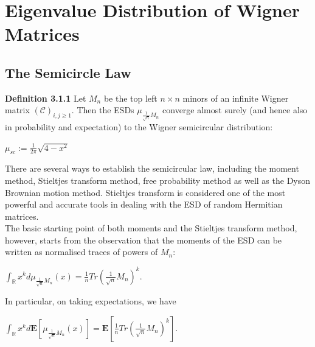 \documentclass{article}
\begin{document}
\section{Eigenvalue Distribution of Wigner Matrices}
 \subsection{The Semicircle Law} 
 \textbf{Definition 3.1.1} Let $M_n$ be the top left $n \times n$ minors of an infinite Wigner matrix $(\mathcal{C})_{i,j \geq 1}$. Then the ESDs $\mu_{\frac{1}{\sqrt{n}} M_n}$ converge almost surely (and hence also in probability and expectation) to the Wigner semicircular distribution:
 \begin{center}
     $\mu_{sc} := \frac{1}{2\pi} \sqrt{4 - x^2}$
 \end{center}
 There are several ways to establish the semicircular law, including the moment method, Stieltjes transform method, free probability method as well as the Dyson Brownian motion method. Stieltjes transform is considered one of the most powerful and accurate tools in dealing with the ESD of random Hermitian matrices.\\
 The basic starting point of both moments and the Stieltjes transform method, however, starts from the observation that the moments of the ESD can be written as normalised traces of powers of $M_n$:
 \begin{center}
     $\int_{\mathbb{R}} x^k d\mu_{\frac{1}{\sqrt{n}}M_n}(x) = \frac{1}{n}Tr(\frac{1}{\sqrt{n}}M_n)^k$.
 \end{center}
 In particular, on taking expectations, we have
 \begin{center}
     $\int_{\mathbb{R}} x^k d\mathbf{E}[\mu_{\frac{1}{\sqrt{n}}M_n}(x)] = \mathbf{E}\left[\frac{1}{n}Tr(\frac{1}{\sqrt{n}}M_n)^k\right]$.
 \end{center}
\end{document}
